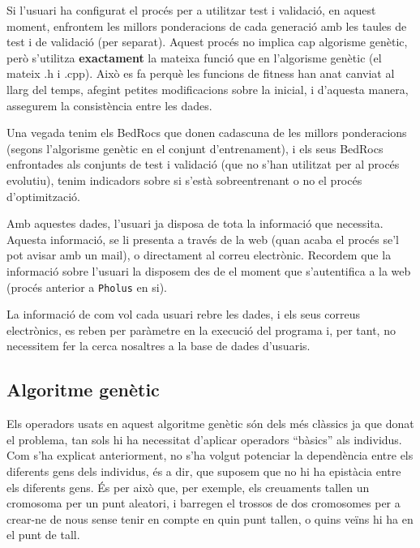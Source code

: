 Si l'usuari ha configurat el procés per a utilitzar test i validació, en
aquest moment, enfrontem les millors ponderacions de cada generació amb les
taules de test i de validació (per separat).  Aquest procés no implica cap
algorisme genètic, però s'utilitza \textbf{exactament} la mateixa funció que en
l'algorisme genètic (el mateix .h i .cpp).  Això es fa perquè les funcions de
fitness han anat canviat al llarg del temps, afegint petites modificacions sobre
la inicial, i d'aquesta manera, assegurem la consistència entre les dades.

Una vegada tenim els BedRocs que donen cadascuna de les millors ponderacions
(segons l'algorisme genètic en el conjunt d'entrenament), i els seus BedRocs
enfrontades als conjunts de test i validació (que no s'han utilitzat per al
procés evolutiu), tenim indicadors sobre si s'està sobreentrenant o no el procés
d'optimització.

Amb aquestes dades, l'usuari ja disposa de tota la informació que necessita.
Aquesta informació, se li presenta a través de la web (quan acaba el procés se'l
pot avisar amb un mail), o directament al correu electrònic.  Recordem que la
informació sobre l'usuari la disposem des de el moment que s'autentifica a la web
(procés anterior a \texttt{Pholus} en si).

La informació de com vol cada usuari rebre les dades, i els seus correus
electrònics, es reben per paràmetre en la execució del programa i, per tant, no
necessitem fer la cerca nosaltres a la base de dades d'usuaris.



\subsection{Algoritme genètic} %
\label{sub:Algoritme genetic}

Els operadors usats en aquest algoritme genètic són dels més clàssics ja que
donat el problema, tan sols hi ha necessitat d'aplicar operadors ``bàsics'' als
individus.  Com s'ha explicat anteriorment, no s'ha volgut potenciar la
dependència entre els diferents gens dels individus, és a dir, que suposem que
no hi ha epistàcia entre els diferents gens.  És per això que, per exemple, els
creuaments tallen un cromosoma per un punt aleatori, i barregen el trossos de
dos cromosomes per a crear-ne de nous sense tenir en compte en quin punt tallen,
o quins veïns hi ha en el punt de tall.

